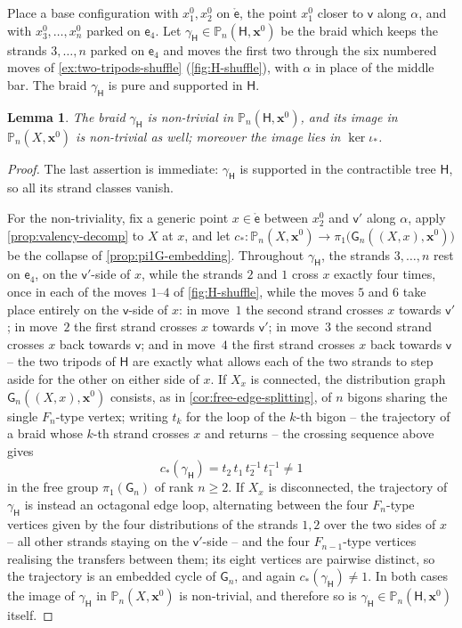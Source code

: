 \documentclass[reqno]{amsart}
\newtheorem{lemma}[theorem]{Lemma}
\theoremstyle{definition}
\newcommand\bfx{\mathbf{x}}
\newcommand\sfG{\mathsf{G}}
\newcommand\sfH{\mathsf{H}}
\newcommand\sfe{\mathsf{e}}
\newcommand\sfv{\mathsf{v}}
\newcommand{\PB}{\mathbb{P}}
\newcommand{\base}{\bfx^0}
\numberwithin{equation}{section}
\begin{document}
Place a base configuration with \(x^0_1,x^0_2\) on
\(\mathring{\sfe}\), the point \(x^0_1\) closer to \(\sfv\)
along \(\alpha\), and with \(x^0_3,\dots,x^0_n\) parked on
\(\sfe_4\). Let \(\gamma_\sfH\in\PB_n(\sfH,\base)\) be the
braid which keeps the strands \(3,\dots,n\) parked on
\(\sfe_4\) and moves the first two through the six numbered
moves of \cref{ex:two-tripods-shuffle}
(\cref{fig:H-shuffle}), with \(\alpha\) in place of the middle
bar. The braid \(\gamma_\sfH\) is pure and supported in
\(\sfH\).



\begin{lemma}\label{lem:H-shuffle}
The braid \(\gamma_\sfH\) is non-trivial in \(\PB_n(\sfH,\base)\), and
its image in \(\PB_n(X,\base)\) is non-trivial as well;
moreover the image lies in \(\ker\iota_\ast\).
\end{lemma}

\begin{proof}
The last assertion is immediate: \(\gamma_\sfH\) is supported in the
contractible tree \(\sfH\), so all its strand classes vanish.

For the non-triviality, fix a generic point \(x\in\mathring{\sfe}\)
between \(x^0_2\) and \(\sfv'\) along \(\alpha\), apply
\cref{prop:valency-decomp} to
\(X\) at \(x\), and let
\(c_\ast\colon\PB_n(X,\base)\to
\pi_1\bigl(\sfG_n((X,x),\base)\bigr)\) be the collapse of
\cref{prop:pi1G-embedding}. Throughout \(\gamma_\sfH\), the strands
\(3,\dots,n\) rest on \(\sfe_4\), on the \(\sfv'\)-side of \(x\), while
the strands \(2\) and \(1\) cross \(x\) exactly four times, once
in each of the moves \(1\)--\(4\) of \cref{fig:H-shuffle}, while
the moves \(5\) and \(6\) take place entirely on the
\(\sfv\)-side of \(x\): in move~\(1\) the second strand crosses
\(x\) towards \(\sfv'\); in move~\(2\) the first strand crosses
\(x\) towards \(\sfv'\); in move~\(3\) the second strand crosses
\(x\) back towards \(\sfv\); and in move~\(4\) the first strand
crosses \(x\) back towards \(\sfv\)
-- the two tripods of \(\sfH\) are exactly what allows each of
the two strands to step aside for the other on either side of
\(x\). If \(X_x\) is connected, the distribution graph
\(\sfG_n((X,x),\base)\) consists, as in
\cref{cor:free-edge-splitting}, of \(n\) bigons sharing the
single \(F_n\)-type vertex; writing \(t_k\) for the loop of the
\(k\)-th bigon -- the trajectory of a braid whose \(k\)-th strand
crosses \(x\) and returns -- the crossing sequence above gives
\[
c_\ast(\gamma_\sfH)=t_2\,t_1\,t_2^{-1}\,t_1^{-1}\neq1
\]
in the free group \(\pi_1(\sfG_n)\) of rank \(n\geq2\). If
\(X_x\) is disconnected, the trajectory of \(\gamma_\sfH\) is
instead an octagonal edge loop, alternating between the four
\(F_n\)-type vertices given by the four distributions of the
strands \(1,2\) over the two sides of \(x\) -- all other strands
staying on the \(\sfv'\)-side -- and the four \(F_{n-1}\)-type
vertices realising the transfers between them; its eight vertices
are pairwise distinct, so the trajectory is an embedded cycle of
\(\sfG_n\), and again \(c_\ast(\gamma_\sfH)\neq1\). In both cases the
image of \(\gamma_\sfH\) in \(\PB_n(X,\base)\) is non-trivial,
and therefore so is \(\gamma_\sfH\in\PB_n(\sfH,\base)\) itself.
\end{proof}
\end{document}
